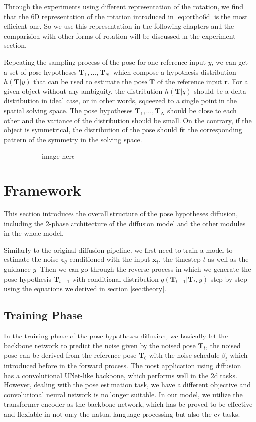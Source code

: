 \documentclass[12pt,DIV14,BCOR12mm,a4paper,footinclude=false,headinclude,parskip=half-,twoside,openright,cleardoublepage=empty,toc=index,bibliography=totoc,listof=totoc]{scrreprt}
\numberwithin{equation}{chapter}
\begin{document}
Through the experiments using different representation of the rotation, we find that the 6D representation of the rotation introduced in \ref{eq:ortho6d} is the most efficient one. So we use this representation in the following chapters and the comparision with other forms of rotation will be discussed in the experiment section.

Repeating the sampling process of the pose for one reference input $y$, we can get a set of pose hypotheses $\mathbf{T}_{1},...,\mathbf{T}_{N}$, which compose a hypothesis distribution $h(\mathbf{T}|y)$ that can be used to estimate the pose $\mathbf{T}$ of the reference input $\mathbf{r}$. For a given object without any ambiguity, the distribution $h(\mathbf{T}|y)$ should be a delta distribution in ideal case, or in other words, squeezed to a single point in the spatial solving space. The pose hypotheses $\mathbf{T}_{1},...,\mathbf{T}_{N}$ should be close to each other and the variance of the distribution should be small. On the contrary, if the object is symmetrical, the distribution of the pose should fit the corresponding pattern of the symmetry in the solving space. 

-----------------image here----------------

\section{Framework}
This section introduces the overall structure of the pose hypotheses diffusion, including the 2-phase architecture of the diffusion model and the other modules in the whole model.

Similarly to the original diffusion pipeline, we first need to train a model to estimate the noise $\boldsymbol{\epsilon}_{\theta}$ conditioned with the input $\mathbf{x}_{t}$, the timestep $t$ as well as the guidance $y$. Then we can go through the reverse process in which we generate the pose hypothesis $\mathbf{T}_{t-1}$ with conditional distribution $q(\mathbf{T}_{t-1}|\mathbf{T}_{t},y)$ step by step using the equations we derived in section \ref{sec:theory}.
\subsection{Training Phase}
In the training phase of the pose hypotheses diffusion, we basically let the backbone network to predict the noise given by the noised pose $\mathbf{T}_{t}$, the noised pose can be derived from the reference pose $\mathbf{T}_{0}$ with the noise schedule $\beta_{t}$ which introduced before in the forward process. The most application using diffusion has a convolutional UNet-like backbone\cite{ronneberger2015unet}, which performs well in the \gls{2d} tasks. However, dealing with the pose estimation task, we have a different objective and convolutional neural network is no longer suitable. In our model, we utilize the transformer encoder as the backbone network, which has be proved to be effective and flexiable in not only the natual language processing but also the \gls{cv} tasks.
\end{document}

